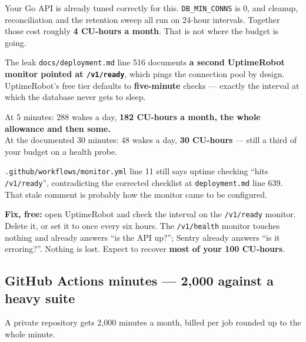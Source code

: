 \documentclass[11pt,a4paper]{article}
\begin{document}
Your Go API is already tuned correctly for this. \texttt{DB\_MIN\_CONNS} is 0, and cleanup, reconciliation and the retention sweep all run on 24-hour intervals. Together those cost roughly \textbf{4 CU-hours a month}. That is not where the budget is going.

\begin{warnbox}{The leak}
\texttt{docs/deployment.md} line 516 documents \textbf{a second UptimeRobot monitor pointed at \texttt{/v1/ready}}, which pings the connection pool by design. UptimeRobot's free tier defaults to \textbf{five-minute} checks --- exactly the interval at which the database never gets to sleep.

At 5 minutes: 288 wakes a day, \textbf{182 CU-hours a month, the whole allowance and then some.}\\
At the documented 30 minutes: 48 wakes a day, \textbf{30 CU-hours} --- still a third of your budget on a health probe.

\texttt{.github/workflows/monitor.yml} line 11 still says uptime checking ``hits \texttt{/v1/ready}'', contradicting the corrected checklist at \texttt{deployment.md} line 639. That stale comment is probably how the monitor came to be configured.
\end{warnbox}

\textbf{Fix, free:} open UptimeRobot and check the interval on the \texttt{/v1/ready} monitor. Delete it, or set it to once every six hours. The \texttt{/v1/health} monitor touches nothing and already answers ``is the API up?''; Sentry already answers ``is it erroring?''. Nothing is lost. Expect to recover \textbf{most of your 100 CU-hours}.

\subsection{GitHub Actions minutes --- 2{,}000 against a heavy suite}

A private repository gets 2{,}000 minutes a month, billed per job rounded up to the whole minute.
\end{document}
